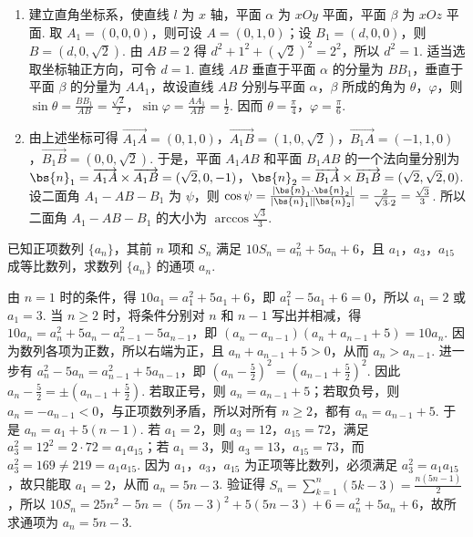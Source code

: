 \begin{solution}
\begin{enumerate}
\item 建立直角坐标系，使直线 \(l\) 为 \(x\) 轴，平面 \(\alpha\) 为 \(xOy\) 平面，平面 \(\beta\) 为 \(xOz\) 平面. 取 \(A_1=(0,0,0)\)，则可设 \(A=(0,1,0)\)；设 \(B_1=(d,0,0)\)，则 \(B=(d,0,\sqrt{2})\). 由 \(AB=2\) 得 \(d^2+1^2+(\sqrt{2})^2=2^2\)，所以 \(d^2=1\). 适当选取坐标轴正方向，可令 \(d=1\). 直线 \(AB\) 垂直于平面 \(\alpha\) 的分量为 \(BB_1\)，垂直于平面 \(\beta\) 的分量为 \(AA_1\)，故设直线 \(AB\) 分别与平面 \(\alpha\)，\(\beta\) 所成的角为 \(\theta\)，\(\varphi\)，则 \(\sin\theta=\frac{BB_1}{AB}=\frac{\sqrt{2}}{2}\)，\(\sin\varphi=\frac{AA_1}{AB}=\frac{1}{2}\). 因而 \(\theta=\frac{\pi}{4}\)，\(\varphi=\frac{\pi}{6}\).
\item 由上述坐标可得 \(\overrightarrow{A_1A}=(0,1,0)\)，\(\overrightarrow{A_1B}=(1,0,\sqrt{2})\)，\(\overrightarrow{B_1A}=(-1,1,0)\)，\(\overrightarrow{B_1B}=(0,0,\sqrt{2})\). 于是，平面 \(A_1AB\) 和平面 \(B_1AB\) 的一个法向量分别为 \(\bs{n}_1=\overrightarrow{A_1A}\times\overrightarrow{A_1B}=(\sqrt{2},0,-1)\)，\(\bs{n}_2=\overrightarrow{B_1A}\times\overrightarrow{B_1B}=(\sqrt{2},\sqrt{2},0)\). 设二面角 \(A_1-AB-B_1\) 为 \(\psi\)，则 \(\cos\psi=\frac{|\bs{n}_1\cdot\bs{n}_2|}{|\bs{n}_1||\bs{n}_2|}=\frac{2}{\sqrt{3}\cdot2}=\frac{\sqrt{3}}{3}\). 所以二面角 \(A_1-AB-B_1\) 的大小为 \(\arccos\frac{\sqrt{3}}{3}\).
\end{enumerate}
\end{solution}

\begin{problem}
已知正项数列 \(\{a_{n}\}\)，其前 \(n\) 项和 \(S_{n}\) 满足 \(10S_{n} = a_{n}^{2} + 5a_{n} + 6\)，且 \(a_{1}\)，\(a_{3}\)，\(a_{15}\) 成等比数列，求数列 \(\{a_{n}\}\) 的通项 \(a_{n}\).
\end{problem}

\begin{solution}
由 \(n=1\) 时的条件，得 \(10a_1=a_1^2+5a_1+6\)，即 \(a_1^2-5a_1+6=0\)，所以 \(a_1=2\) 或 \(a_1=3\). 当 \(n\geqslant2\) 时，将条件分别对 \(n\) 和 \(n-1\) 写出并相减，得 \(10a_n=a_n^2+5a_n-a_{n-1}^2-5a_{n-1}\)，即 \((a_n-a_{n-1})(a_n+a_{n-1}+5)=10a_n\). 因为数列各项为正数，所以右端为正，且 \(a_n+a_{n-1}+5>0\)，从而 \(a_n>a_{n-1}\). 进一步有 \(a_n^2-5a_n=a_{n-1}^2+5a_{n-1}\)，即 \(\left(a_n-\frac{5}{2}\right)^2=\left(a_{n-1}+\frac{5}{2}\right)^2\). 因此 \(a_n-\frac{5}{2}=\pm\left(a_{n-1}+\frac{5}{2}\right)\). 若取正号，则 \(a_n=a_{n-1}+5\)；若取负号，则 \(a_n=-a_{n-1}<0\)，与正项数列矛盾，所以对所有 \(n\geqslant2\)，都有 \(a_n=a_{n-1}+5\). 于是 \(a_n=a_1+5(n-1)\). 若 \(a_1=2\)，则 \(a_3=12\)，\(a_{15}=72\)，满足 \(a_3^2=12^2=2\cdot72=a_1a_{15}\)；若 \(a_1=3\)，则 \(a_3=13\)，\(a_{15}=73\)，而 \(a_3^2=169\neq219=a_1a_{15}\). 因为 \(a_1\)，\(a_3\)，\(a_{15}\) 为正项等比数列，必须满足 \(a_3^2=a_1a_{15}\)，故只能取 \(a_1=2\)，从而 \(a_n=5n-3\). 验证得 \(S_n=\sum_{k=1}^n(5k-3)=\frac{n(5n-1)}{2}\)，所以 \(10S_n=25n^2-5n=(5n-3)^2+5(5n-3)+6=a_n^2+5a_n+6\)，故所求通项为 \(a_n=5n-3\).
\end{solution}


